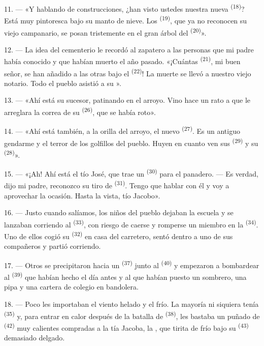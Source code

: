 11. --- «Y hablando de construcciones, ¿han visto ustedes nuestra nueva
 \textsuperscript{(18)}? Está muy pintoresca bajo su manto de nieve.
Los  \textsuperscript{(19)}, que ya no reconocen su viejo
campanario, se posan tristemente en el gran árbol del 
\textsuperscript{(20)}».

12. --- La idea del cementerio le recordó al zapatero a las personas que
mi padre había conocido y que habían muerto el año pasado. «¡Cuántas
 \textsuperscript{(21)}, mi buen señor, se han añadido a las otras
bajo el  \textsuperscript{(22)}! La muerte se llevó a nuestro viejo
notario. Todo el pueblo asistió a su ».

13. --- «Ahí está su sucesor, patinando en el arroyo. Vino hace un rato a
que le arreglara la correa de su  \textsuperscript{(26)}, que se había
roto».

14. --- «Ahí está también, a la orilla del arroyo, el nuevo
 \textsuperscript{(27)}. Es un antiguo gendarme y el terror de
los golfillos del pueblo. Huyen en cuanto ven sus 
\textsuperscript{(29)} y su  \textsuperscript{(28)}».

15. --- «¡Ah! Ahí está el tío José, que trae un  \textsuperscript{(30)} para el panadero. --- Es verdad, dijo mi padre,
reconozco su tiro de  \textsuperscript{(31)}. Tengo que hablar con él y
voy a aprovechar la ocasión. Hasta la vista, tío Jacobo».

16. --- Justo cuando salíamos, los niños del pueblo dejaban la escuela y
se lanzaban corriendo al  \textsuperscript{(33)}, con riesgo de
caerse y romperse un miembro en la  \textsuperscript{(34)}. Uno de
ellos cogió su  \textsuperscript{(32)} en casa del carretero, sentó
dentro a uno de sus compañeros y partió corriendo.

17. --- Otros se precipitaron hacia un 
\textsuperscript{(37)} junto al  \textsuperscript{(40)} y empezaron a
bombardear al  \textsuperscript{(39)} que habían hecho el día
antes y al que habían puesto un sombrero, una pipa y una cartera de
colegio en bandolera.

18. --- Poco les importaban el viento helado y el frío. La mayoría ni
siquiera tenía  \textsuperscript{(35)} y, para entrar en calor
después de la batalla de  \textsuperscript{(38)}, les bastaba
un puñado de  \textsuperscript{(42)} muy calientes compradas a la
tía Jacoba, la , que tirita de frío bajo su 
\textsuperscript{(43)} demasiado delgado.

